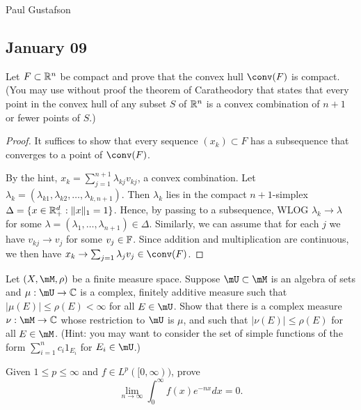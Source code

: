 \documentclass{article}
\begin{document}
\noindent Paul Gustafson\\

\subsection*{January 09}
 Let $F \subset \mathbb{R}^n$ be compact and prove that the convex hull $\conv(F)$ is compact. (You may use without proof the theorem of Caratheodory that states that every point in the convex hull of any subset $S$ of $\mathbb{R}^n$ is a convex combination of $n+1$ or fewer points of $S$.)
\begin{proof}
It suffices to show that every sequence $(x_k) \subset F$ has a subsequence that converges to a point of $\conv(F)$.

 By the hint, $x_k = \sum_{j = 1}^{n + 1} \lambda_{kj} v_{kj}$, a convex combination.   Let $\lambda_k = (\lambda_{k1}, \lambda_{k2}, \ldots, \lambda_{k,n+1})$.  Then $\lambda_k$ lies in the compact $n+1$-simplex $\Delta = \{x \in \mathbb{R}^d_+ : \|x\|_1 = 1\}$. Hence, by passing to a subsequence, WLOG $\lambda_k \to \lambda$ for some $\lambda = (\lambda_1, \ldots, \lambda_{n+1}) \in \Delta$.  Similarly, we can assume that for each $j$ we have $v_{kj} \to v_j$ for some $v_j \in \mathbb{F}$.  Since addition and multiplication are continuous, we then have $x_k \to \sum_{j=1} \lambda_j v_j \in \conv(F)$.
\end{proof}

 Let $(X, \mM, \rho)$ be a finite measure space. Suppose $\mU \subset \mM$ is an algebra of sets and $\mu : \mU \to \C$ is a complex, finitely additive measure such that $|\mu(E)| \le \rho(E) < \infty$ for all $E \in \mU$. Show that there is a complex measure $\nu : \mM \to \C$ whose restriction to $\mU$ is $\mu$, and such that $|\nu(E)| \le \rho(E)$ for all $E \in \mM$. (Hint: you may want to consider the set of simple functions of the form $\sum_{i=1}^n c_i 1_{E_i}$ for $E_i \in \mU$.)

 Given $1 \le p \le \infty$ and $f \in L^p([0, \infty))$, prove 
$$\lim_{n \to \infty} \int_0^\infty f(x) e^{-nx} dx = 0.$$
\end{document}
